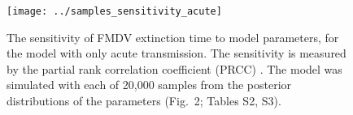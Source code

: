 \documentclass[12pt]{article}
\begin{document}
\begin{figure}
  \centering
  \texttt{[image: ../samples\_sensitivity\_acute]}
  \caption{The sensitivity of FMDV extinction time to model
    parameters, for the model with only acute transmission.
    The sensitivity is measured by the partial rank correlation
    coefficient (PRCC) \autocite{blower_1994}.
    The model was simulated with each of 20,000 samples from the
    posterior distributions of the parameters
    (Fig.~2; Tables S2, S3).}
\end{figure}
\end{document}
